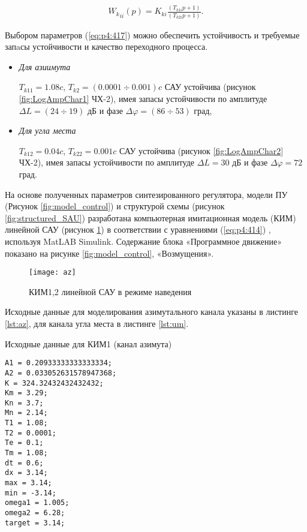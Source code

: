 \begin{equation}%
\label{eq:p4:417}
\begin{alignedat}{2}
{W_{k}}_{ii} \left( p \right) =K_{ki}\frac{ \left( T_{k1i}p+1 \right) }{ \left( T_{k2i}p+1 \right) }.
\end{alignedat}
\end{equation}

Выбором параметров (\ref{eq:p4:417}) можно обеспечить устойчивость и требуемые запaсы устойчивости и качество переходного процесса. 
\begin{itemize}
	\item \textit{Для азиимута}\par
	$T_{k11} = 1.08 c$, $T_{k2} = (0.0001  \div 0.001) c$  САУ устойчива (рисунок \ref{fig:LogAmpChar1} ЧХ-2), имея запасы устойчивости по амплитуде $\varDelta L = (24 \div 19)$ дБ и фазе $\varDelta \varphi = (86 \div 53)$ град,
	\item \textit{Для угла места}\par
	$T_{k12} = 0.04 c$, $T_{k22} =  0.001 c$  САУ устойчива (рисунок \ref{fig:LogAmpChar2} ЧХ-2), имея запасы устойчивости по амплитуде $\varDelta L = 30$ дБ и фазе $\varDelta \varphi = 72$ град.
\end{itemize}

На основе полученных параметров синтезированного регулятора, модели ПУ (Рисунок \ref{fig:model_control}) и структурой схемы (рисунок \ref{fig:structured_SAU}) разработана компьютерная имитационная модель (КИМ) линейной САУ (рисунок \ref{fig:az}) в соответствии с уравнениями (\ref{eq:p4:414}) , используя MatLAB Simulink. Содержание блока «Программное движение» показано на рисунке \ref{fig:model_control}, «Возмущения». 

\begin{figure}[ht]
	\centering
	\texttt{[image: az]} 
	\caption{КИМ1,2 линейной САУ в режиме наведения}
	\label{fig:az}
\end{figure}

Исходные данные для моделирования азимутального канала указаны в листинге \ref{lst:az}, для канала угла места в листинге \ref{lst:um}. 

\begin{ListingEnv}[!h]%
	\captiondelim{ } %
	\caption{Исходные данные для КИМ1 (канал азимута)}
	\label{lst:az}
	\begin{lstlisting}
A1 = 0.20933333333333334;
A2 = 0.033052631578947368;
K = 324.32432432432432;
Km = 3.29;
Kn = 3.7;
Mn = 2.14;
T1 = 1.08;
T2 = 0.0001;
Te = 0.1;
Tm = 1.08;
dt = 0.6;
dx = 3.14;
max = 3.14;
min = -3.14;
omega1 = 1.005;
omega2 = 6.28;
target = 3.14;
	\end{lstlisting}
\end{ListingEnv}%

